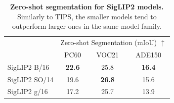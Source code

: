\begin{table}[t]
\caption{\small\textbf{Zero-shot segmentation for SigLIP2 models.} Similarly to TIPS, the smaller models tend to outperform larger ones in the same model family.}
\vspace{-2mm}
\scriptsize
\centering
{
\begin{tabular}{l c c c}
\small \multirow{2}{*}{Model} & \multicolumn{3}{c}{Zero-shot Segmentation (mIoU) $\uparrow$} \\
 & PC60 & VOC21 & ADE150 \\
\midrule
SigLIP2 B/16 & \bf{22.6} & 25.8 & \bf{16.4} \\
SigLIP2 SO/14 & 19.6 & \bf{26.8} & 15.6 \\
SigLIP2 g/16 & 17.2 & 25.7 & 13.9 \\
\end{tabular}
}
\vspace{-0mm}
\label{tab:zeroseg_scale_siglipv2}
\end{table}
